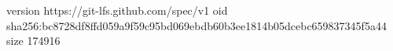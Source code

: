 version https://git-lfs.github.com/spec/v1
oid sha256:bc8728df8ffd059a9f59c95bd069ebdb60b3ee1814b05dcebc659837345f5a44
size 174916
